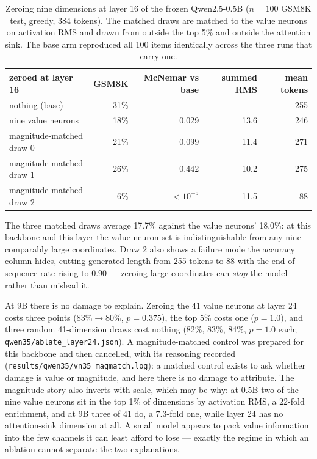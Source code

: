 \documentclass[11pt]{article}
\newcommand{\code}[1]{\texttt{#1}}
\begin{document}
\begin{table}[t]
\centering
\caption{Zeroing nine dimensions at layer 16 of the frozen Qwen2.5-0.5B ($n{=}100$ GSM8K test, greedy, 384 tokens). The matched draws are matched to the value neurons on activation RMS and drawn from outside the top 5\% and outside the attention sink. The base arm reproduced all 100 items identically across the three runs that carry one.}
\label{tab:vnablate}
\small
\begin{tabular}{lrrrr}
\toprule
zeroed at layer 16 & GSM8K & McNemar vs base & summed RMS & mean tokens \\
\midrule
nothing (base) & 31\% & --- & --- & 255 \\
nine value neurons & 18\% & 0.029 & 13.6 & 246 \\
magnitude-matched draw 0 & 21\% & 0.099 & 11.4 & 271 \\
magnitude-matched draw 1 & 26\% & 0.442 & 10.2 & 275 \\
magnitude-matched draw 2 & 6\% & $<10^{-5}$ & 11.5 & 88 \\
\bottomrule
\end{tabular}
\end{table}

The three matched draws average 17.7\% against the value neurons' 18.0\%: at this backbone and this layer the value-neuron set is indistinguishable from any nine comparably large coordinates. Draw 2 also shows a failure mode the accuracy column hides, cutting generated length from 255 tokens to 88 with the end-of-sequence rate rising to 0.90 --- zeroing large coordinates can \emph{stop} the model rather than mislead it.

At 9B there is no damage to explain. Zeroing the 41 value neurons at layer 24 costs three points ($83\% \to 80\%$, $p = 0.375$), the top 5\% costs one ($p = 1.0$), and three random 41-dimension draws cost nothing (82\%, 83\%, 84\%, $p = 1.0$ each; \code{qwen35/ablate\_layer24.json}). A magnitude-matched control was prepared for this backbone and then cancelled, with its reasoning recorded (\code{results/qwen35/vn35\_magmatch.log}): a matched control exists to ask whether damage is value or magnitude, and here there is no damage to attribute. The magnitude story also inverts with scale, which may be why: at 0.5B two of the nine value neurons sit in the top 1\% of dimensions by activation RMS, a 22-fold enrichment, and at 9B three of 41 do, a 7.3-fold one, while layer 24 has no attention-sink dimension at all. A small model appears to pack value information into the few channels it can least afford to lose --- exactly the regime in which an ablation cannot separate the two explanations.
\end{document}
